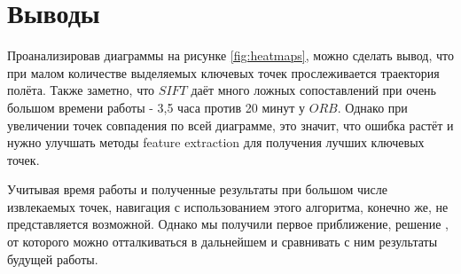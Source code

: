 \section{Выводы}

Проанализировав диаграммы на рисунке \ref{fig:heatmaps}, можно сделать вывод, что при малом количестве выделяемых ключевых точек прослеживается траектория полёта. Также заметно, что $SIFT$ даёт много ложных сопоставлений при очень большом времени работы - 3,5 часа против 20 минут у $ORB$. Однако при увеличении точек совпадения  по всей диаграмме, это значит, что ошибка растёт и нужно улучшать методы feature extraction для получения лучших ключевых точек.

Учитывая время работы и полученные результаты при большом числе извлекаемых точек, навигация с использованием этого алгоритма, конечно же, не представляется возможной. Однако мы получили первое приближение, решение , от которого можно отталкиваться в дальнейшем и сравнивать с ним результаты будущей работы.

\newpage